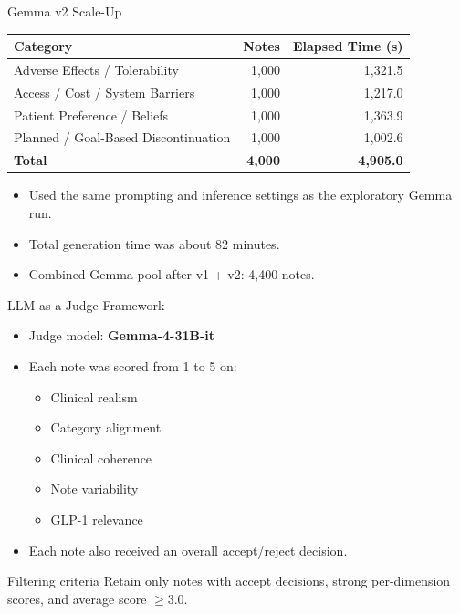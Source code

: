 \documentclass[aspectratio=169]{beamer}
\begin{document}
\begin{frame}{Gemma v2 Scale-Up}
    \small
    \begin{table}
        \centering
        \begin{tabular}{lrr}
            \toprule
            \textbf{Category} & \textbf{Notes} & \textbf{Elapsed Time (s)} \\
            \midrule
            Adverse Effects / Tolerability & 1,000 & 1,321.5 \\
            Access / Cost / System Barriers & 1,000 & 1,217.0 \\
            Patient Preference / Beliefs & 1,000 & 1,363.9 \\
            Planned / Goal-Based Discontinuation & 1,000 & 1,002.6 \\
            \midrule
            \textbf{Total} & \textbf{4,000} & \textbf{4,905.0} \\
            \bottomrule
        \end{tabular}
    \end{table}

    \begin{itemize}
        \item Used the same prompting and inference settings as the exploratory Gemma run.
        \item Total generation time was about 82 minutes.
        \item Combined Gemma pool after v1 + v2: 4,400 notes.
    \end{itemize}
\end{frame}

\begin{frame}{LLM-as-a-Judge Framework}
    \begin{itemize}
        \item Judge model: \textbf{Gemma-4-31B-it}
        \item Each note was scored from 1 to 5 on:
        \begin{itemize}
            \item Clinical realism
            \item Category alignment
            \item Clinical coherence
            \item Note variability
            \item GLP-1 relevance
        \end{itemize}
        \item Each note also received an overall accept/reject decision.
    \end{itemize}

    \begin{block}{Filtering criteria}
        Retain only notes with accept decisions, strong per-dimension scores, and average score $\geq 3.0$.
    \end{block}
\end{frame}
\end{document}
